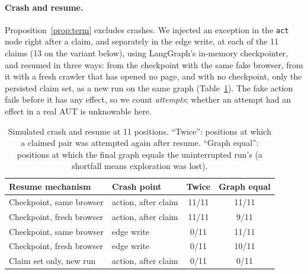 \paragraph{Crash and resume.}
Proposition~\ref{prop:term} excludes crashes. We injected an exception in the
\texttt{act} node right after a claim, and separately in the edge write, at each of
the 11 claims (13 on the variant below), using LangGraph's in-memory checkpointer, and resumed in three ways:
from the checkpoint with the same fake browser, from it with a fresh crawler that
has opened no page, and with no checkpoint, only the persisted claim set, as a new
run on the same graph (Table~\ref{tab:resume}). The fake action fails before it has
any effect, so we count \emph{attempts}; whether an attempt had an effect in a real
AUT is unknowable here.
\begin{table}[tbp]
\caption{Simulated crash and resume at 11 positions. ``Twice'': positions at which
a claimed pair was attempted again after resume. ``Graph equal'': positions at which
the final graph equals the uninterrupted run's (a shortfall means exploration was
lost).}
\label{tab:resume}
\setlength{\tabcolsep}{3.5pt}
\footnotesize
\begin{tabular}{@{}llcc@{}}
\toprule
Resume mechanism & Crash point & Twice & Graph equal \\
\midrule
Checkpoint, same browser & action, after claim & 11/11 & 11/11 \\
Checkpoint, fresh browser & action, after claim & 11/11 & 9/11 \\
Checkpoint, same browser & edge write & 0/11 & 11/11 \\
Checkpoint, fresh browser & edge write & 0/11 & 10/11 \\
Claim set only, new run & action, after claim & 0/11 & 0/11 \\
\bottomrule
\end{tabular}
\end{table}

